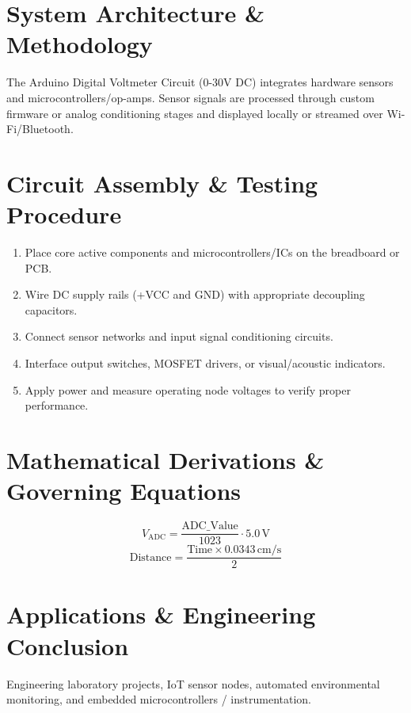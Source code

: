 \documentclass[11pt,a4paper]{article}
\begin{document}
\section{System Architecture \& Methodology}
The Arduino Digital Voltmeter Circuit (0-30V DC) integrates hardware sensors and microcontrollers/op-amps. Sensor signals are processed through custom firmware or analog conditioning stages and displayed locally or streamed over Wi-Fi/Bluetooth.

\section{Circuit Assembly \& Testing Procedure}
\begin{enumerate}
    \item Place core active components and microcontrollers/ICs on the breadboard or PCB.
    \item Wire DC supply rails (+VCC and GND) with appropriate decoupling capacitors.
    \item Connect sensor networks and input signal conditioning circuits.
    \item Interface output switches, MOSFET drivers, or visual/acoustic indicators.
    \item Apply power and measure operating node voltages to verify proper performance.
\end{enumerate}

\section{Mathematical Derivations \& Governing Equations}
\begin{equation}
V_{\text{ADC}} = \frac{\text{ADC\_Value}}{1023} \cdot 5.0\,\text{V}
\end{equation}
\begin{equation}
\text{Distance} = \frac{\text{Time} \times 0.0343\,\text{cm/s}}{2}
\end{equation}

\section{Applications \& Engineering Conclusion}
Engineering laboratory projects, IoT sensor nodes, automated environmental monitoring, and embedded microcontrollers / instrumentation.
\end{document}
